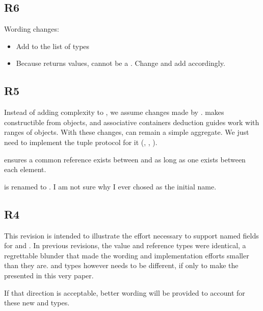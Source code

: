 \documentclass{wg21}
\begin{document}
\subsection{R6}
Wording changes:
\begin{itemize}
    \item Add  to the list of  types
    \item Because  returns values,  
    cannot be a . Change  and add  accordingly.
\end{itemize}

\subsection{R5}

Instead of adding complexity to , we assume changes made by .
 makes  constructible from  objects, and associative containers deduction guides work
with ranges of  objects.
With these changes,  can remain a simple aggregate. We just need to implement the tuple protocol for it (, , ).

 ensures a common reference exists between  and  as long as one exists between each element.

 is renamed to . I am not sure why I ever chosed  as the initial name.

\subsection{R4}

This revision is intended to illustrate the effort necessary to support named fields for  and .
In previous revisions, the value and reference types were identical, a regrettable blunder that made the wording and implementation efforts smaller than they are.
 and  types however needs to be different, if only to make the  presented in this very paper.

If that direction is acceptable, better wording will be provided to account for these new  and  types.
\end{document}
